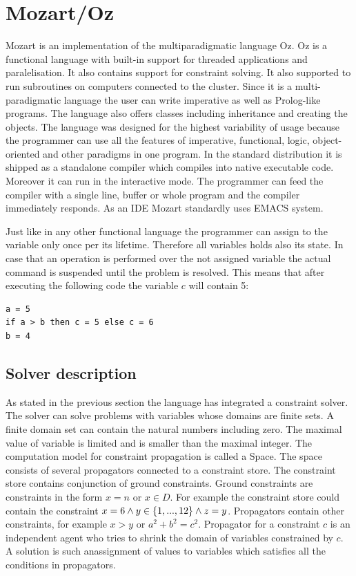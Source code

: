 \section{Mozart/Oz}

Mozart is an implementation of the multiparadigmatic language Oz. Oz is a functional
language with built-in support for threaded applications and paralelisation. It also
contains support for constraint solving. It also supported to run subroutines on computers
connected to the cluster. Since it is a multi-paradigmatic language the user
can write imperative as well as Prolog-like programs. The language also offers classes
including inheritance and creating the objects. The language was designed for the
highest variability of usage because the programmer can use all the features of imperative,
functional, logic, object-oriented and other paradigms in one program. In the standard distribution
it is shipped as a standalone compiler which compiles into native executable code.
Moreover it can run in the interactive mode. The programmer can feed the compiler with
a single line, buffer or whole program and the compiler immediately responds. As an IDE
Mozart standardly uses EMACS system.

Just like in any other functional language the programmer can assign to the variable 
only once per its lifetime. Therefore all variables holds also its state. In case that
an operation is performed over the not assigned variable the actual command is suspended
until the problem is resolved. This means that after executing the following code the
variable $c$ will contain 5:

\begin{verbatim}
a = 5
if a > b then c = 5 else c = 6
b = 4
\end{verbatim}

\subsection{Solver description}
As stated in the previous section the language has integrated a constraint solver. The solver
can solve problems with variables whose domains are finite sets. A finite domain
set can contain the natural numbers including zero. The maximal value of variable is limited and is smaller 
than the maximal integer. The computation model for constraint propagation is called 
a Space. The space consists of several propagators connected to a constraint store.
The constraint store contains conjunction of ground constraints. Ground constraints
are constraints in the form $x=n$ or $x \in D$. For example the constraint store could
contain the constraint $x = 6 \wedge y \in \{1, ..., 12\} \wedge z = y$. Propagators contain
other constraints, for example $x>y$ or $a^2 + b^2 = c^2$. Propagator for a constraint
 $c$ is an independent agent who tries to shrink the domain of variables constrained
 by $c$. A solution is such  anassignment of values to variables which satisfies all the conditions
 in propagators.
 
